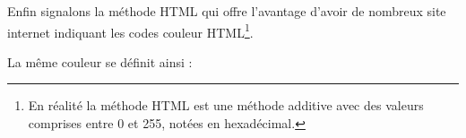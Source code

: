 \begin{latexcode}
\end{latexcode}

Enfin signalons la méthode HTML qui offre l'avantage d'avoir de nombreux site internet indiquant les codes couleur HTML\footnote{En réalité la méthode HTML est une méthode additive avec des valeurs comprises entre 0 et 255, notées en hexadécimal.}.

La même couleur se définit ainsi :

\begin{latexcode}
\end{latexcode}





